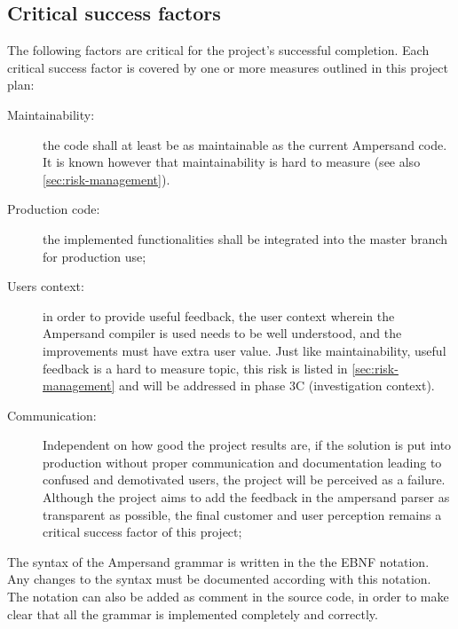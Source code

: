 \subsection{Critical success factors}
\label{subsec:success-factors}
The following factors are critical for the project's successful completion.
Each critical success factor is covered by one or more measures outlined in this project plan:
\begin{description}
	\item[Maintainability:] the code shall at least be as maintainable as the current Ampersand code.
		It is known however that maintainability is hard to measure (see also \autoref{sec:risk-management}).
	\item[Production code:] the implemented functionalities shall be integrated into the master branch for production use;
	\item[Users context:] in order to provide useful feedback, the user context wherein the Ampersand compiler is used needs to be well understood, and the improvements must have extra user value. 
		Just like maintainability, useful feedback is a hard to measure topic, this risk is listed in \autoref{sec:risk-management} and will be addressed in phase 3C (investigation context).
	\item[Communication:] Independent on how good the project results are, if the solution is put into production without proper communication and documentation leading to confused and demotivated users, the project will be perceived as a failure. 
	Although the project aims to add the feedback in the ampersand parser as transparent as possible, the final customer and user perception remains a critical success factor of this project;
\end{description}
%
The syntax of the Ampersand grammar is written in the the EBNF notation.
Any changes to the syntax must be documented according with this notation.
The notation can also be added as comment in the source code, in order to make clear that all the grammar is implemented completely and correctly.

